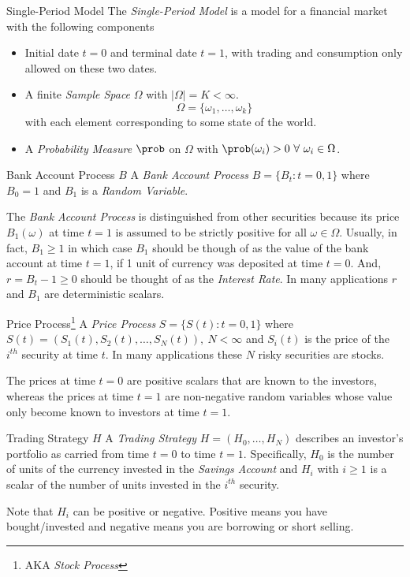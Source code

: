 \documentclass[11pt,a4paper]{article}
\begin{document}
  \begin{definition}{Single-Period Model}
    The \textit{Single-Period Model} is a model for a financial market with the following components
    \begin{itemize}
      \item Initial date $t=0$ and terminal date $t=1$, with trading and consumption only allowed on these two dates.
      \item A finite \textit{Sample Space} $\Omega$ with $|\Omega|=K<\infty$.
      \[ \Omega=\{\omega_1,\dots,\omega_k\} \]
      with each element corresponding to some state of the world.
      \item A \textit{Probability Measure} $\prob$ on $\Omega$ with $\prob(\omega_i)>0\ \forall\ \omega_i\in\Omega$.
    \end{itemize}
  \end{definition}

  \begin{definition}{Bank Account Process $B$}
    A \textit{Bank Account Process} $B=\{B_t:t=0,1\}$ where $B_0=1$ and $B_1$ is a \textit{Random Variable}.
    \par The \textit{Bank Account Process} is distinguished from other securities because its price $B_1(\omega)$ at time $t=1$ is assumed to be strictly positive for all $\omega\in \Omega$. Usually, in fact, $B_1\geq1$ in which case $B_1$ should be though of as the value of the bank account at time $t=1$, if 1 unit of currency was deposited at time $t=0$. And, $r=B_t-1\geq0$ should be thought of as the \textit{Interest Rate}. In many applications $r$ and $B_1$ are deterministic scalars.
  \end{definition}

  \begin{definition}{Price Process\footnote{AKA \textit{Stock Process}}}
    A \textit{Price Process} $S=\{S(t):t=0,1\}$ where $S(t)=(S_1(t),S_2(t),\dots,S_N(t)),\ N<\infty$ and $S_i(t)$ is the price of the $i^{th}$ security at time $t$. In many applications these $N$ risky securities are stocks.
    \par The prices at time $t=0$ are positive scalars that are known to the investors, whereas the prices at time $t=1$ are non-negative random variables whose value only become known to investors at time $t=1$.
  \end{definition}

  \begin{definition}{Trading Strategy $H$}
    A \textit{Trading Strategy} $H=(H_0,\dots,H_N)$ describes an investor's portfolio as carried from time $t=0$ to time $t=1$. Specifically, $H_0$ is the number of units of the currency invested in the \textit{Savings Account} and $H_i$ with $i\geq1$ is a scalar of the number of units invested in the $i^{th}$ security.
    \par Note that $H_i$ can be positive or negative. Positive means you have bought/invested and negative means you are borrowing or short selling.
  \end{definition}
\end{document}
